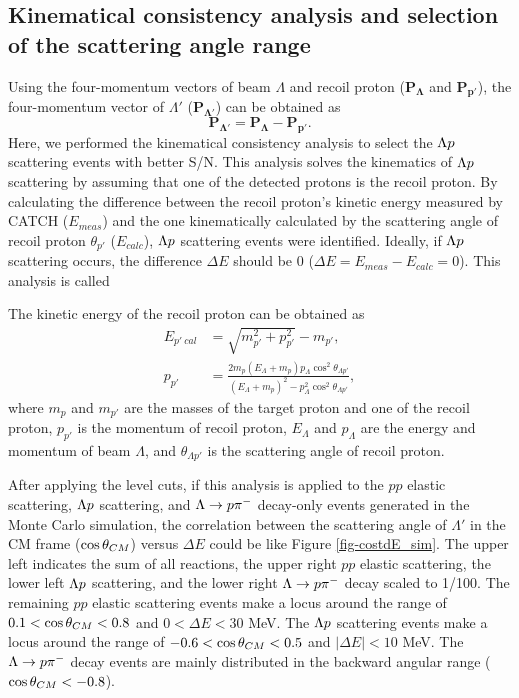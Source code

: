 \subsection{Kinematical consistency analysis and selection of the scattering angle range}
\label{sec-2p_wo_kine}

Using the four-momentum vectors of beam $\Lambda$ and recoil proton ($\bm{P_{\Lambda}}$ and $\bm{P_{p'}}$), the four-momentum vector of $\Lambda'$ ($\bm{P_{\Lambda'}}$) can be obtained as 
\begin{equation}
  \bm{P_{\Lambda'}} = \bm{P_{\Lambda}} - \bm{P_{p'}}. 
\end{equation}
Here, we performed the kinematical consistency analysis to select the $\Lambda p$ scattering events with better S/N. This analysis solves the kinematics of $\Lambda p$ scattering by assuming that one of the detected protons is the recoil proton. By calculating the difference between the recoil proton's kinetic energy measured by CATCH ($E_{meas}$) and the one kinematically calculated by the scattering angle of recoil proton $\theta_{p'}$ ($E_{calc}$), $\Lambda p$ scattering events were identified. Ideally, if $\Lambda p$ scattering occurs, the difference $\Delta E$ should be 0 ($\Delta E = E_{meas} - E_{calc} = 0$). This analysis is called 

The kinetic energy of the recoil proton can be obtained as 
\begin{align}
  E_{p'\ cal} &= \sqrt{m_{p'}^{2} + p_{p'}^{2}} - m_{p'}, \\
  p_{p'} &= \frac{2m_{p}(E_{\Lambda} + m_{p})p_{\Lambda} \cos^{2}{\theta_{\Lambda p'}}} {(E_{\Lambda} + m_{p})^{2} - p_{\Lambda}^{2} \cos^{2}{\theta_{\Lambda p'}}},
  \label{eq-dE_recop}
\end{align}
where $m_{p}$ and $m_{p'}$ are the masses of the target proton and one of the recoil proton, $p_{p'}$ is the momentum of recoil proton, $E_{\Lambda}$ and $p_{\Lambda}$ are the energy and momentum of beam $\Lambda$, and $\theta_{\Lambda p'}$ is the scattering angle of recoil proton. 

After applying the  level cuts, if this analysis is applied to the $pp$ elastic scattering, $\Lambda p$ scattering, and $\Lambda\to p\pi^{-}$ decay-only events generated in the Monte Carlo simulation, the correlation between the scattering angle of $\Lambda'$ in the CM frame ($\cos{\theta}_{CM}$) versus $\Delta E$ could be like Figure \ref{fig-costdE_sim}. The upper left indicates the sum of all reactions, the upper right $pp$ elastic scattering, the lower left $\Lambda p$ scattering, and the lower right $\Lambda\to p\pi^{-}$ decay scaled to 1/100. The remaining $pp$ elastic scattering events make a locus around the range of $0.1<\cos{\theta}_{CM}<0.8$ and $0<\Delta E<30$ MeV. The $\Lambda p$ scattering events make a locus around the range of $-0.6<\cos{\theta}_{CM}<0.5$ and $|\Delta E|<10$ MeV. The $\Lambda\to p\pi^{-}$ decay events are mainly distributed in the backward angular range ($\cos{\theta}_{CM}<-0.8$).

